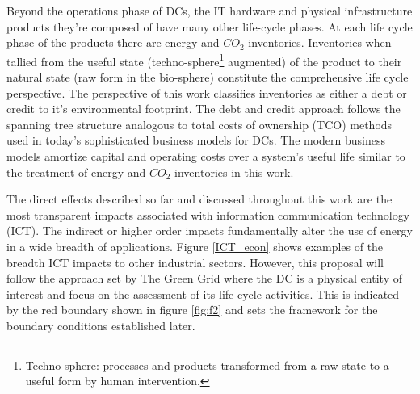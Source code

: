 Beyond the operations phase of DCs, the IT hardware and physical infrastructure products they're composed of have many other life-cycle phases. At each life cycle phase of the products there are energy and $CO_2$ inventories. Inventories when tallied from the useful state (techno-sphere\footnote{Techno-sphere: processes and products transformed from a raw state to a useful form by human intervention.} augmented) of the product to their natural state (raw form in the bio-sphere) constitute the comprehensive life cycle perspective.  The perspective of this work classifies inventories as either a debt or credit to it's environmental footprint. The debt and credit approach follows the spanning tree structure analogous to total costs of ownership (TCO) methods used in today's sophisticated business models for DCs. The modern business models amortize capital and operating costs over a system's useful life similar to the treatment of energy and $CO_2$ inventories in this work.

The direct effects described so far and discussed throughout this work are the most transparent impacts associated with information communication technology (ICT). The indirect or higher order impacts fundamentally alter the use of energy in a wide breadth of applications. Figure \ref{ICT_econ} shows examples of the breadth ICT impacts to other industrial sectors. However, this proposal will follow the approach set by The Green Grid \citep{tgg12} where the DC is a physical entity of interest and focus on the assessment of its life cycle activities. This is indicated by the red boundary shown in figure  \ref{fig:f2} and sets the framework for the boundary conditions established later. 